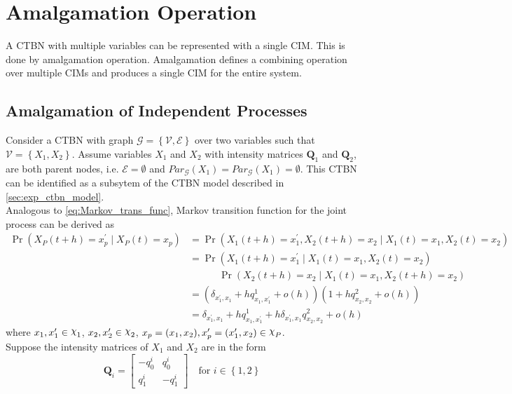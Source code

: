 %
\appendix

\chapter{Amalgamation Operation}
\label{ap:amalgamation}
A CTBN with multiple variables can be represented with a single CIM. This is done by amalgamation operation. Amalgamation defines a combining operation over multiple CIMs and produces a single CIM for the entire system. \cite{Nodelman1995}

\section{Amalgamation of Independent Processes}
Consider a CTBN with graph $ \mathcal{G} = \left\lbrace \mathcal{V}, \mathcal{E} \right\rbrace $ over two variables such that $ \mathcal{V} = \left\lbrace X_1, X_2\right\rbrace $. Assume variables $ X_1 $ and $ X_2 $ with intensity matrices $ \textbf{Q}_1 $ and $ \textbf{Q}_2 $, are both parent nodes, i.e. $ \mathcal{E} = \emptyset $ and $ Par_{\mathcal{G}}(X_1) = Par_{\mathcal{G}}(X_1) = \emptyset $. This CTBN can be identified as a subsytem of the CTBN model described in \cref{sec:exp_ctbn_model}. \\
Analogous to \autoref{eq:Markov_trans_func}, Markov transition function for the joint process can be derived as
\begin{align}
	\operatorname{Pr}(X_P(t+h) = x_p^\prime\mid X_P(t) = x_p)
	&=  \operatorname{Pr}(X_1(t+h) = x_1^\prime, X_2(t+h) = x_2 \mid X_1(t) = x_1, X_2(t) = x_2)\nonumber \\
	&= \operatorname{Pr}(X_1(t+h) = x_1^\prime \mid X_1(t) = x_1, X_2(t) = x_2) \nonumber\\
	& \quad \quad \quad \operatorname{Pr}( X_2(t+h) = x_2 \mid X_1(t) = x_1, X_2(t+h) = x_2) \nonumber\\
	& = (\delta_{x_1^\prime, x_1} + hq^1_{x_1, x_1^\prime} + o(h))(1 + hq^2_{x_2, x_2} + o(h))\nonumber\\
	& = \delta_{x_1^\prime, x_1} + hq^1_{x_1, x_1^\prime} + h\delta_{x_1^\prime, x_1}q^2_{x_2, x_2} + o(h)
	\label{eq:amalg}
\end{align}
where $ x_1, x_1^\prime \in \rchi_1 $, $ x_2, x_2^\prime \in \rchi_2 $, $ x_p = (x_1, x_2), x_p^\prime = (x_1^\prime, x_2) \in \rchi_P $.\\
Suppose the intensity matrices of $ X_1 $ and $ X_2 $ are in the form
\begin{equation}
\textbf{Q}_i = 
\begin{bmatrix}
-q^{i}_{0} & q^{i}_{0} \\
q^{i}_{1} & -q^{i}_{1}
\end{bmatrix} \quad \text{for } i \in \left\lbrace 1,2\right\rbrace 
\end{equation}

